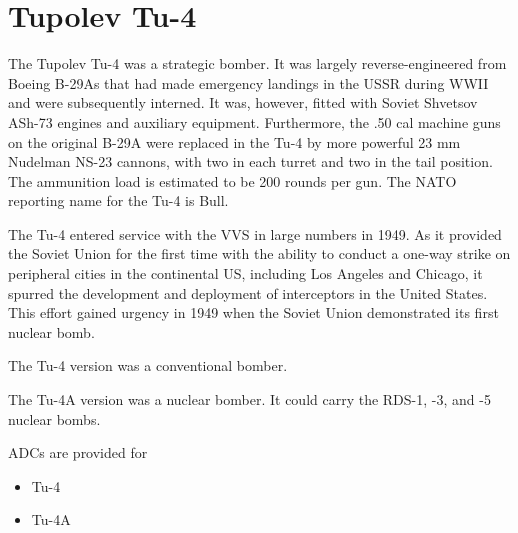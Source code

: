 \section*{Tupolev Tu-4}

The Tupolev Tu-4 was a strategic bomber. It was largely reverse-engineered from Boeing B-29As that had made emergency landings in the USSR during WWII and were subsequently interned. It was, however, fitted with Soviet Shvetsov ASh-73 engines and auxiliary equipment. Furthermore, the .50 cal machine guns on the original B-29A were replaced in the Tu-4 by more powerful 23 mm Nudelman NS-23 cannons, with two in each turret and two in the tail position. The ammunition load is estimated to be 200 rounds per gun. The NATO reporting name for the Tu-4 is Bull.

The Tu-4 entered service with the VVS in large numbers in 1949. As it provided the Soviet Union for the first time with the ability to conduct a one-way strike on peripheral cities in the continental US, including Los Angeles and Chicago, it spurred the development and deployment of interceptors in the United States. This effort gained urgency in 1949 when the Soviet Union demonstrated its first nuclear bomb.

The Tu-4 version was a conventional bomber.

The Tu-4A version was a nuclear bomber. It could carry the RDS-1, -3, and -5 nuclear bombs.

ADCs are provided for
\begin{itemize}
    \item Tu-4
    \item Tu-4A
\end{itemize}